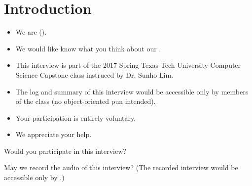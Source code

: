 \section{Introduction}

\begin{itemize}
\item We are \tc{} (\names).
\item We would like know what you think about
  our \cry{} \cf.
\item This interview is part of the 2017 Spring
  Texas Tech University Computer Science Capstone class
  instruced by Dr. Sunho Lim.
\item The log and summary of this interview
  would be accessible only by members of the class
  (no object-oriented pun intended).
\item Your participation is entirely voluntary.
\item We appreciate your help.
\end{itemize}

\begin{question}
Would you participate in this interview?
\end{question}

\begin{question}
May we record the audio of this interview?
(The recorded interview would be accessible only by \tc.)
\end{question}
